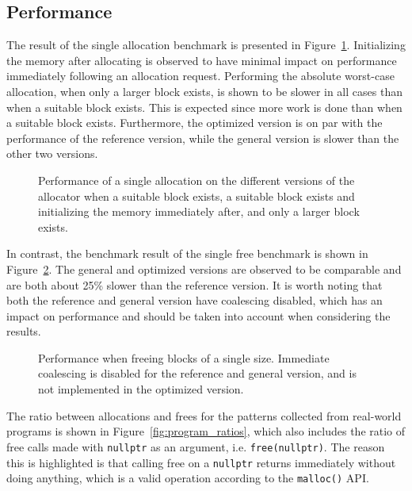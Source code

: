 
\subsection{Performance}
\label{sec:results:performance}

The result of the single allocation benchmark is presented in Figure~\ref{fig:allocation_performance}. Initializing the memory after allocating is observed to have minimal impact on performance immediately following an allocation request. Performing the absolute worst-case allocation, when only a larger block exists, is shown to be slower in all cases than when a suitable block exists. This is expected since more work is done than when a suitable block exists. Furthermore, the optimized version is on par with the performance of the reference version, while the general version is slower than the other two versions. 

\begin{figure}[H]
    \centering
    
    \caption{Performance of a single allocation on the different versions of the allocator when a suitable block exists, a suitable block exists and initializing the memory immediately after, and only a larger block exists.}
    \label{fig:allocation_performance}
\end{figure}

In contrast, the benchmark result of the single free benchmark is shown in Figure~\ref{fig:free_performance}. The general and optimized versions are observed to be comparable and are both about 25\% slower than the reference version. It is worth noting that both the reference and general version have coalescing disabled, which has an impact on performance and should be taken into account when considering the results.

\begin{figure}[H]
    \centering
    
    \caption{Performance when freeing blocks of a single size. Immediate coalescing is disabled for the reference and general version, and is not implemented in the optimized version.}
    \label{fig:free_performance}
\end{figure}

The ratio between allocations and frees for the patterns collected from real-world programs is shown in Figure~\ref{fig:program_ratios}, which also includes the ratio of free calls made with \texttt{nullptr} as an argument, i.e. \texttt{free(nullptr)}. The reason this is highlighted is that calling free on a \texttt{nullptr} returns immediately without doing anything, which is a valid operation according to the \texttt{malloc()} API.

